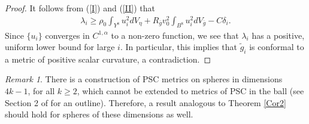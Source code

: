 \documentclass{amsart}
\newcommand{\wti}{\widetilde{g}_i}
\theoremstyle{definition}
\theoremstyle{remark}
\newtheorem{remark}[theorem]{Remark}
\numberwithin{equation}{section}
\begin{document}
\begin{proof}
It follows from (\ref{I}) and (\ref{II}) that
\begin{align*}
\lambda_i \geq \rho_0 \int_{Y^8}  u_i^2 dV_{\eta} + R_{\overline{g}} v_0^2\int_{B^8} u_i^2 dV_{\overline{g}}  - C \delta_i.
\end{align*}
Since $\{ u_i \}$ converges in $C^{1,\alpha}$ to a non-zero function, we see that $\lambda_i$ has a positive, uniform lower bound for large $i$.  In particular, this implies that $\wti$ is conformal to a metric of positive scalar curvature, a contradiction.
\end{proof}

\begin{remark}  There is a construction of PSC metrics on spheres in dimensions $4k -1$, for all $k \geq 2$, which cannot be extended to metrics of PSC in the ball (see Section 2 of \cite{Rosenberg} for an outline).  Therefore, a result analogous to Theorem \ref{Cor2} should hold for spheres of these dimensions as well.  \end{remark}
\end{document}
